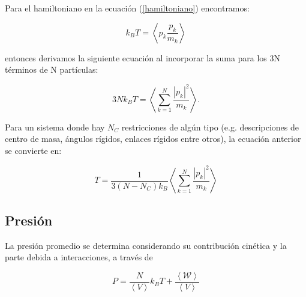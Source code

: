 Para el hamiltoniano en la ecuación (\ref{hamiltoniano}) encontramos:

\begin{equation} \label{virialtemp}
    k_B T = \left \langle p_k \frac{p_k}{m_k} \right \rangle
\end{equation}

\noindent entonces derivamos la siguiente ecuación al incorporar la suma para los 3N términos de N partículas:

\begin{equation} \label{virialsumtemp}
    3Nk_B T = \left \langle \sum_{k=1}^{N}\frac{|p_k|^2}{m_k} \right \rangle.
\end{equation}

Para un sistema donde hay $N_C$ restricciones de algún tipo (e.g. descripciones de centro de masa, ángulos rígidos, enlaces rígidos entre otros), la ecuación anterior se convierte en:

\begin{equation} \label{virialsumconsttemp}
    T= \frac{1}{3(N - N_C)k_B}\left \langle \sum_{k=1}^{N}\frac{|p_k|^2}{m_k} \right \rangle
\end{equation}

\subsection{Presión}






La presión promedio se determina considerando su contribución cinética y la parte debida a interacciones, a través de

\begin{equation} \label{virialsumconstpress}
    P = \frac{N}{\left \langle V \right \rangle} k_B T + \frac{\left \langle \mathcal{W} \right \rangle}{\left \langle V \right \rangle}
\end{equation}

